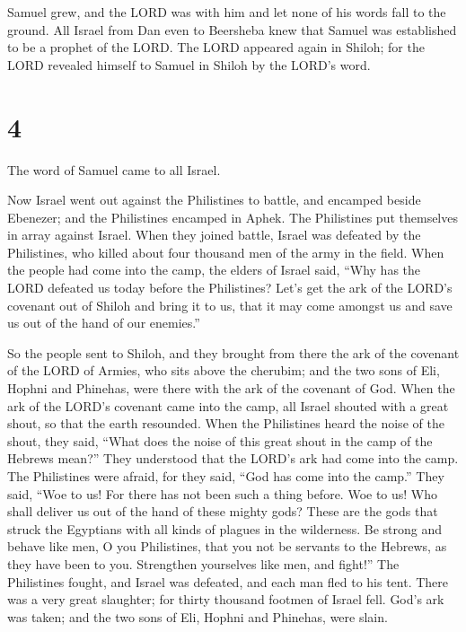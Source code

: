  Samuel grew, and the LORD was with him and let none of his
words fall to the ground.  All Israel from Dan even to
Beersheba knew that Samuel was established to be a prophet of the LORD.
 The LORD appeared again in Shiloh; for the LORD revealed
himself to Samuel in Shiloh by the LORD's word.

\hypertarget{section-3}{%
\section{4}\label{section-3}}

 The word of Samuel came to all Israel.

Now Israel went out against the Philistines to battle, and encamped
beside Ebenezer; and the Philistines encamped in Aphek.  The
Philistines put themselves in array against Israel. When they joined
battle, Israel was defeated by the Philistines, who killed about four
thousand men of the army in the field.  When the people had
come into the camp, the elders of Israel said, ``Why has the LORD
defeated us today before the Philistines? Let's get the ark of the
LORD's covenant out of Shiloh and bring it to us, that it may come
amongst us and save us out of the hand of our enemies.''

 So the people sent to Shiloh, and they brought from there
the ark of the covenant of the LORD of Armies, who sits above the
cherubim; and the two sons of Eli, Hophni and Phinehas, were there with
the ark of the covenant of God.  When the ark of the LORD's
covenant came into the camp, all Israel shouted with a great shout, so
that the earth resounded.  When the Philistines heard the
noise of the shout, they said, ``What does the noise of this great shout
in the camp of the Hebrews mean?'' They understood that the LORD's ark
had come into the camp.  The Philistines were afraid, for
they said, ``God has come into the camp.'' They said, ``Woe to us! For
there has not been such a thing before.  Woe to us! Who
shall deliver us out of the hand of these mighty gods? These are the
gods that struck the Egyptians with all kinds of plagues in the
wilderness.  Be strong and behave like men, O you
Philistines, that you not be servants to the Hebrews, as they have been
to you. Strengthen yourselves like men, and fight!''  The
Philistines fought, and Israel was defeated, and each man fled to his
tent. There was a very great slaughter; for thirty thousand footmen of
Israel fell.  God's ark was taken; and the two sons of Eli,
Hophni and Phinehas, were slain.

